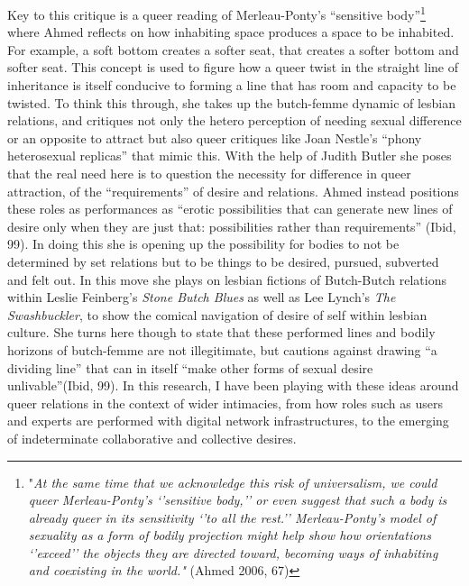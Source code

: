 Key to this critique is a queer reading of Merleau-Ponty's ``sensitive
body''\footnote{"\emph{At the same time that we acknowledge this risk of
  universalism, we could queer Merleau-Ponty's `'sensitive body,'' or
  even suggest that such a body is already queer in its sensitivity `'to
  all the rest.'' Merleau-Ponty's model of sexuality as a} \emph{form of
  bodily projection might help show how orientations `'exceed'' the
  objects they are directed toward, becoming ways of inhabiting and
  coexisting in the world."} (Ahmed 2006, 67)} where Ahmed reflects on
how inhabiting space produces a space to be inhabited. For example, a
soft bottom creates a softer seat, that creates a softer bottom and
softer seat. This concept is used to figure how a queer twist in the
straight line of inheritance is itself conducive to forming a line that
has room and capacity to be twisted. To think this through, she takes up
the butch-femme dynamic of lesbian relations, and critiques not only the
hetero perception of needing sexual difference or an opposite to attract
but also queer critiques like Joan Nestle's ``phony heterosexual
replicas'' that mimic this. With the help of Judith Butler she poses
that the real need here is to question the necessity for difference in
queer attraction, of the ``requirements'' of desire and relations. Ahmed
instead positions these roles as performances as ``erotic possibilities
that can generate new lines of desire only when they are just that:
possibilities rather than requirements'' (Ibid, 99). In doing this she
is opening up the possibility for bodies to not be determined by set
relations but to be things to be desired, pursued, subverted and felt
out. In this move she plays on lesbian fictions of Butch-Butch relations
within Leslie Feinberg's \emph{Stone Butch Blues} as well as Lee Lynch's
\emph{The Swashbuckler}, to show the comical navigation of desire of
self within lesbian culture. She turns here though to state that these
performed lines and bodily horizons of butch-femme are not illegitimate,
but cautions against drawing ``a dividing line'' that can in itself
``make other forms of sexual desire unlivable''(Ibid, 99). In this
research, I have been playing with these ideas around queer relations in
the context of wider intimacies, from how roles such as users and
experts are performed with digital network infrastructures, to the
emerging of indeterminate collaborative and collective desires.

